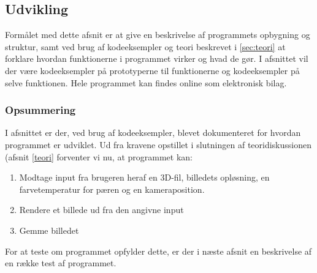 \subsection{Udvikling}
Formålet med dette afsnit er at give en beskrivelse af programmets opbygning og struktur, samt ved brug af kodeeksempler og teori beskrevet i \ref{sec:teori} at forklare hvordan funktionerne i programmet virker og hvad de gør. I afsnittet vil der være kodeeksempler på prototyperne til funktionerne og kodeeksempler på selve funktionen. Hele programmet kan findes online som elektronisk bilag.







\subsubsection*{Opsummering}

I afsnittet er der, ved brug af kodeeksempler, blevet dokumenteret for hvordan programmet er udviklet. Ud fra kravene opstillet i slutningen af teoridiskussionen (afsnit \ref{teori} forventer vi nu, at programmet kan:

\begin{enumerate}
    \item Modtage input fra brugeren heraf en 3D-fil, billedets opløsning, en farvetemperatur for pæren og en kameraposition.
    \item Rendere et billede ud fra den angivne input
    \item Gemme billedet
\end{enumerate}

For at teste om programmet opfylder dette, er der i næste afsnit en beskrivelse af en række test af programmet.